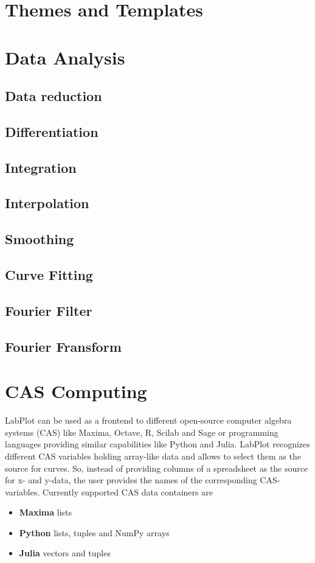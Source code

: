 \chapter{Themes and Templates}


\chapter{Data Analysis}
\section{Data reduction}
\section{Differentiation}
\section{Integration}
\section{Interpolation}
\section{Smoothing}
\section{Curve Fitting}
\section{Fourier Filter}
\section{Fourier Fransform}

\chapter{CAS Computing}
LabPlot can be used as a frontend to different open-source computer algebra systems (CAS) like Maxima, Octave, R, Scilab and Sage  or programming languages providing similar capabilities like Python and Julia. LabPlot recognizes different CAS variables holding array-like data and allows to select them as the source for curves. So, instead of providing columns of a spreadsheet as the source for x- and y-data, the user provides the names of the corresponding CAS-variables. Currently supported CAS data containers are
\begin{itemize}
\item \textbf{Maxima} lists
\item \textbf{Python} lists, tuples and NumPy arrays
\item \textbf{Julia} vectors and tuples
\end{itemize}


